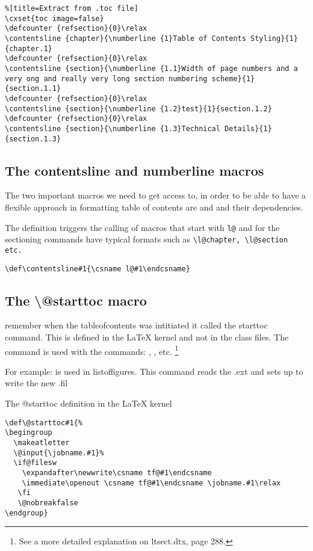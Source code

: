 \begin{lstlisting}%[title=Extract from .toc file]
\cxset{toc image=false}
\defcounter {refsection}{0}\relax
\contentsline {chapter}{\numberline {1}Table of Contents Styling}{1}{chapter.1}
\defcounter {refsection}{0}\relax
\contentsline {section}{\numberline {1.1}Width of page numbers and a very ong and really very long section numbering scheme}{1}{section.1.1}
\defcounter {refsection}{0}\relax
\contentsline {section}{\numberline {1.2}test}{1}{section.1.2}
\defcounter {refsection}{0}\relax
\contentsline {section}{\numberline {1.3}Technical Details}{1}{section.1.3}
\end{lstlisting}

\subsection{The contentsline and numberline macros}

The two important macros we need to get access to, in order to be able to have a flexible approach in formatting table of contents are  and  and their dependencies.

The  definition triggers the calling of macros that start with \verb+l@+ and for the sectioning commands have typical formats such as \lstinline{\l@chapter, \l@section etc.}

\begin{tcolorbox}
\begin{lstlisting}
\def\contentsline#1{\csname l@#1\endcsname}
\end{lstlisting}
\end{tcolorbox}

\subsection{The \textbackslash @starttoc macro}

remember when the tableofcontents was intitiated it called the starttoc command. This is defined in the LaTeX kernel and not in the class files. The  command is used with the commands:
, , etc. \footnote{See a more detailed explanation on ltsect.dtx, page 288.}

For example:  is used in listoffigures. This command
reads the .ext and sets up to write the new .fil

\begin{tcolorbox}{The @starttoc definition in the LaTeX kernel}
\begin{lstlisting}
\def\@starttoc#1{%
\begingroup
  \makeatletter
  \@input{\jobname.#1}%
  \if@filesw
    \expandafter\newwrite\csname tf@#1\endcsname
    \immediate\openout \csname tf@#1\endcsname \jobname.#1\relax
   \fi
   \@nobreakfalse
\endgroup}
\end{lstlisting}
\end{tcolorbox}

